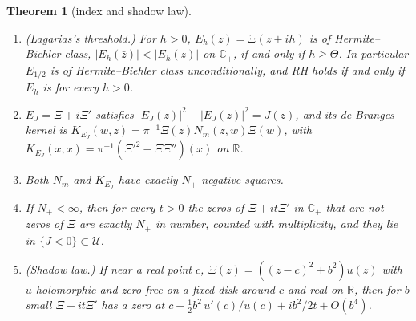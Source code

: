\documentclass[11pt]{article}
\newtheorem{theorem}{Theorem}[section]
\theoremstyle{definition}\newtheorem{definition}[theorem]{Definition}
\theoremstyle{remark}\newtheorem{remark}[theorem]{Remark}
\newcommand{\R}{\mathbb R}\newcommand{\C}{\mathbb C}\newcommand{\N}{\mathbb N}
\begin{document}
\begin{theorem}[index and shadow law]\label{mt:index}
\begin{enumerate}[label=(\roman*)]
\item \emph{(Lagarias's threshold.)} For $h>0$, $E_h(z)=\Xi(z+ih)$ is of Hermite--Biehler class, $|E_h(\bar z)|<|E_h(z)|$ on $\C_+$, if and only if $h\ge\Theta$. In particular $E_{1/2}$ is of Hermite--Biehler class unconditionally, and RH holds if and only if $E_h$ is for every $h>0$.
\item $E_J=\Xi+i\Xi'$ satisfies $|E_J(z)|^2-|E_J(\bar z)|^2=J(z)$, and its de Branges kernel is $K_{E_J}(w,z)=\pi^{-1}\Xi(z)N_m(z,w)\overline{\Xi(w)}$, with $K_{E_J}(x,x)=\pi^{-1}(\Xi'^2-\Xi\Xi'')(x)$ on $\R$.
\item Both $N_m$ and $K_{E_J}$ have exactly $N_+$ negative squares.
\item If $N_+<\infty$, then for every $t>0$ the zeros of $\Xi+it\Xi'$ in $\C_+$ that are not zeros of $\Xi$ are exactly $N_+$ in number, counted with multiplicity, and they lie in $\{J<0\}\subset\mathcal U$.
\item \emph{(Shadow law.)} If near a real point $c$, $\Xi(z)=((z-c)^2+b^2)u(z)$ with $u$ holomorphic and zero-free on a fixed disk around $c$ and real on $\R$, then for $b$ small $\Xi+it\Xi'$ has a zero at $c-\frac12b^2\,u'(c)/u(c)+ib^2/2t+O(b^4)$.
\end{enumerate}
\end{theorem}
\end{document}
